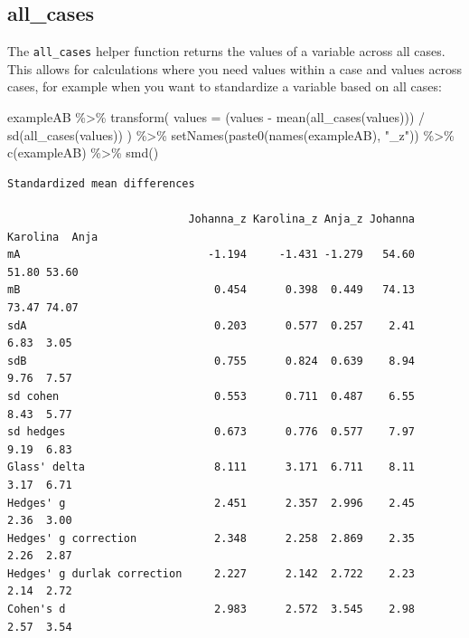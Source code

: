 \documentclass[
  letterpaper,
  DIV=11,
  numbers=noendperiod]{scrreprt}
\newenvironment{Shaded}{\begin{snugshade}}{\end{snugshade}}
\newcommand{\AttributeTok}[1]{\textcolor[rgb]{0.40,0.45,0.13}{#1}}
\newcommand{\FunctionTok}[1]{\textcolor[rgb]{0.28,0.35,0.67}{#1}}
\newcommand{\NormalTok}[1]{\textcolor[rgb]{0.00,0.23,0.31}{#1}}
\newcommand{\SpecialCharTok}[1]{\textcolor[rgb]{0.37,0.37,0.37}{#1}}
\newcommand{\StringTok}[1]{\textcolor[rgb]{0.13,0.47,0.30}{#1}}
\begin{document}
\hypertarget{all_cases}{%
\subsection{all\_cases}\label{all_cases}}

The \texttt{all\_cases} helper function returns the values of a variable
across all cases. This allows for calculations where you need values
within a case and values across cases, for example when you want to
standardize a variable based on all cases:

\begin{Shaded}
\begin{Highlighting}[]
\NormalTok{exampleAB }\SpecialCharTok{\%\textgreater{}\%}
  \FunctionTok{transform}\NormalTok{(}
    \AttributeTok{values =}\NormalTok{ (values }\SpecialCharTok{{-}} \FunctionTok{mean}\NormalTok{(}\FunctionTok{all\_cases}\NormalTok{(values))) }\SpecialCharTok{/} \FunctionTok{sd}\NormalTok{(}\FunctionTok{all\_cases}\NormalTok{(values))}
\NormalTok{  ) }\SpecialCharTok{\%\textgreater{}\%}
  \FunctionTok{setNames}\NormalTok{(}\FunctionTok{paste0}\NormalTok{(}\FunctionTok{names}\NormalTok{(exampleAB), }\StringTok{"\_z"}\NormalTok{)) }\SpecialCharTok{\%\textgreater{}\%}
  \FunctionTok{c}\NormalTok{(exampleAB) }\SpecialCharTok{\%\textgreater{}\%}
  \FunctionTok{smd}\NormalTok{()}
\end{Highlighting}
\end{Shaded}

\begin{verbatim}
Standardized mean differences

                            Johanna_z Karolina_z Anja_z Johanna Karolina  Anja
mA                             -1.194     -1.431 -1.279   54.60    51.80 53.60
mB                              0.454      0.398  0.449   74.13    73.47 74.07
sdA                             0.203      0.577  0.257    2.41     6.83  3.05
sdB                             0.755      0.824  0.639    8.94     9.76  7.57
sd cohen                        0.553      0.711  0.487    6.55     8.43  5.77
sd hedges                       0.673      0.776  0.577    7.97     9.19  6.83
Glass' delta                    8.111      3.171  6.711    8.11     3.17  6.71
Hedges' g                       2.451      2.357  2.996    2.45     2.36  3.00
Hedges' g correction            2.348      2.258  2.869    2.35     2.26  2.87
Hedges' g durlak correction     2.227      2.142  2.722    2.23     2.14  2.72
Cohen's d                       2.983      2.572  3.545    2.98     2.57  3.54
\end{verbatim}
\end{document}
